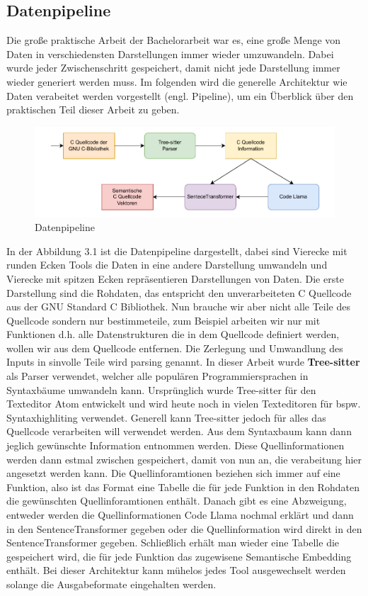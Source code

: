 \documentclass[12pt,letterpaper,ngerman]{article}
\begin{document}
\subsection{Datenpipeline}
Die große praktische Arbeit der Bachelorarbeit war es, eine große Menge
von Daten in verschiedensten Darstellungen immer wieder umzuwandeln. Dabei 
wurde jeder Zwischenschritt gespeichert, damit nicht jede Darstellung immer
wieder generiert werden muss. Im folgenden wird die generelle Architektur 
wie Daten verabeitet werden vorgestellt (engl. Pipeline), um ein Überblick
über den praktischen Teil dieser Arbeit zu geben.
\begin{figure}[H]
  \begin{center}
    \includegraphics[scale=0.8]{abb/data-pipeline.pdf}
  \end{center}
  \caption{Datenpipeline}
\end{figure}
In der Abbildung 3.1 ist die Datenpipeline dargestellt, dabei sind Vierecke 
mit runden Ecken Tools die Daten in eine andere Darstellung umwandeln und
Vierecke mit spitzen Ecken repräsentieren Darstellungen von Daten. Die erste
Darstellung sind die Rohdaten, das entspricht den unverarbeiteten C Quellcode
aus der GNU Standard C Bibliothek. Nun brauche wir aber nicht alle Teile des
Quellcode sondern nur bestimmeteile, zum Beispiel arbeiten wir nur mit Funktionen
d.h. alle Datenstrukturen die in dem Quellcode definiert werden, wollen wir
aus dem Quellcode entfernen. Die Zerlegung und Umwandlung des Inputs 
in sinvolle Teile wird parsing genannt. In dieser Arbeit wurde {\bf Tree-sitter}
als Parser verwendet, welcher alle populären Programmiersprachen in Syntaxbäume
umwandeln kann. Ursprünglich wurde Tree-sitter für den Texteditor Atom entwickelt
und wird heute noch in vielen Texteditoren für bspw. Syntaxhighliting verwendet.
Generell kann Tree-sitter jedoch für alles das Quellcode verarbeiten will 
verwendet werden. Aus dem Syntaxbaum kann dann jeglich gewünschte Information 
entnommen werden. Diese Quellinformationen werden dann estmal zwischen gespeichert,
damit von nun an, die verabeitung hier angesetzt werden kann. Die Quellinforamtionen
beziehen sich immer auf eine Funktion, also ist das Format eine Tabelle die
für jede Funktion in den Rohdaten die gewünschten Quellinforamtionen enthält.
Danach gibt es eine Abzweigung, entweder werden die Quellinformationen Code Llama
nochmal erklärt und dann in den SentenceTransformer gegeben oder die 
Quellinformation wird direkt in den SentenceTransformer gegeben. Schließlich 
erhält man wieder eine Tabelle die gespeichert wird, die für jede Funktion
das zugewisene Semantische Embedding enthält. Bei dieser Architektur kann
mühelos jedes Tool ausgewechselt werden solange die Ausgabeformate eingehalten
werden.
\end{document}

